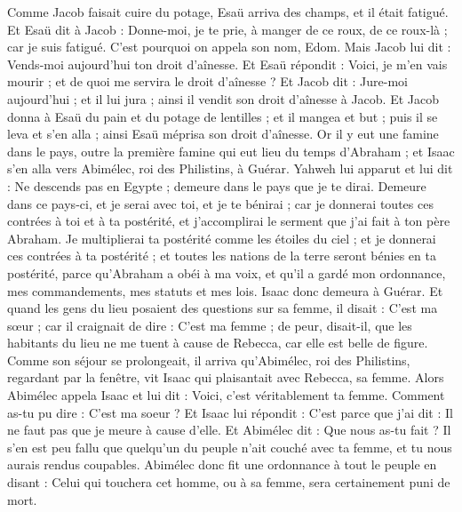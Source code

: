 \begin{multicols}{2}
Comme Jacob faisait cuire du potage, Esaü arriva des champs, et il était fatigué.
Et Esaü dit à Jacob : Donne-moi, je te prie, à manger de ce roux, de ce roux-là ; car je suis fatigué. C'est pourquoi on appela son nom, Edom.
Mais Jacob lui dit : Vends-moi aujourd'hui ton droit d'aînesse.
Et Esaü répondit : Voici, je m'en vais mourir ; et de quoi me servira le droit d'aînesse ?
Et Jacob dit : Jure-moi aujourd'hui ; et il lui jura ; ainsi il vendit son droit d'aînesse à Jacob.
Et Jacob donna à Esaü du pain et du potage de lentilles ; et il mangea et but ; puis il se leva et s'en alla ; ainsi Esaü méprisa son droit d'aînesse.
\VerseOne{}Or il y eut une famine dans le pays, outre la première famine qui eut lieu du temps d'Abraham ; et Isaac s'en alla vers Abimélec, roi des Philistins, à Guérar.
Yahweh lui apparut et lui dit : Ne descends pas en Egypte ; demeure dans le pays que je te dirai.
Demeure dans ce pays-ci, et je serai avec toi, et je te bénirai ; car je donnerai toutes ces contrées à toi et à ta postérité, et j'accomplirai le serment que j'ai fait à ton père Abraham.
Je multiplierai ta postérité comme les étoiles du ciel ; et je donnerai ces contrées à ta postérité ; et toutes les nations de la terre seront bénies en ta postérité,
parce qu'Abraham a obéi à ma voix, et qu'il a gardé mon ordonnance, mes commandements, mes statuts et mes lois.
Isaac donc demeura à Guérar.
Et quand les gens du lieu posaient des questions sur sa femme, il disait : C'est ma sœur ; car il craignait de dire : C'est ma femme ; de peur, disait-il, que les habitants du lieu ne me tuent à cause de Rebecca, car elle est belle de figure.
Comme son séjour se prolongeait, il arriva qu'Abimélec, roi des Philistins, regardant par la fenêtre, vit Isaac qui plaisantait avec Rebecca, sa femme.
Alors Abimélec appela Isaac et lui dit : Voici, c'est véritablement ta femme. Comment as-tu pu dire : C'est ma soeur ? Et Isaac lui répondit : C'est parce que j'ai dit : Il ne faut pas que je meure à cause d'elle.
Et Abimélec dit : Que nous as-tu fait ? Il s'en est peu fallu que quelqu'un du peuple n'ait couché avec ta femme, et tu nous aurais rendus coupables.
Abimélec donc fit une ordonnance à tout le peuple en disant : Celui qui touchera cet homme, ou à sa femme, sera certainement puni de mort.

\end{multicols}
